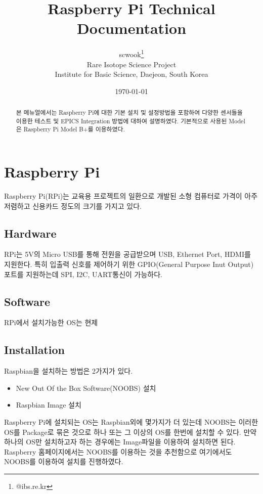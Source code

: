 \documentclass[11pt
  , a4paper
  , article
  , oneside
]{memoir}
\begin{document}
\newcommand{\technumber}{
  RAON Control-Document Series\\
  Revision : v1.0,   Release : a fixed date}
\title{\textbf{Raspberry Pi Technical Documentation}}

\author{scwook\thanks{@ibs.re.kr} \\

  Rare Isotope Science Project\\
  Institute for Basic Science, Daejeon, South Korea
}
\date{\today}

\renewcommand{\maketitlehooka}{\begin{flushright}\textsf{\technumber}\end{flushright}}

\maketitle

\begin{abstract}
본 메뉴얼에서는 Raspberry Pi에 대한 기본 설치 및 설정방법을 포함하여 다양한 센서들을 이용한 테스트 및 
EPICS Integration 방법에 대하여 설명하였다. 기본적으로 사용된 Model은 Raspberry Pi Model B+를 
이용하였다.\citep{FAI}
\end{abstract}

\chapter{Raspberry Pi}
Raspberry Pi(RPi)는 교육용 프로젝트의 일환으로 개발된 소형 컴퓨터로 가격이 아주 저렴하고 신용카드 정도의
크기를 가지고 있다.
\section{Hardware}
RPi는 5V의 Micro USB를 통해 전원을 공급받으며 USB, Ethernet Port, HDMI를 지원한다. 
특히 입출력 신호를 제어하기 위한 GPIO(General Purpose Inut Output)
포트를 지원하는데 SPI, I2C, UART통신이 가능하다.
\section{Software}
RPi에서 설치가능한 OS는 현제 
\section{Installation}
Raspbian을 설치하는 방법은 2가지가 있다.
\begin{itemize}
\item New Out Of the Box Software(NOOBS) 설치
\item Raspbian Image 설치
\end{itemize}
Raspberry Pi에 설치되는 OS는 Raspbian외에 몇가지가 더 있는데 NOOBS는 이러한 OS를 Package로 묶은 것으로 
하나 또는 그 이상의 OS를 한번에 설치할 수 있다. 만약 하나의 OS만 설치하고자 하는 경우에는 Image파일을 
이용하여 설치하면 된다. Raspberry 홈페이지에서는 NOOBS를 이용하는 것을 추천함으로 여기에서도 NOOBS를 
이용하여 설치를 진행하였다.
\end{document}

